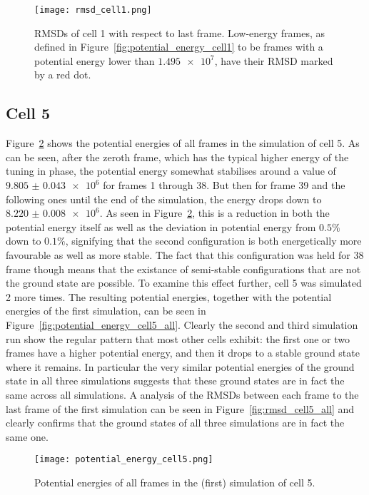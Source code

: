 \begin{figure}[ht]
\centering
  \texttt{[image: rmsd\_cell1.png]}
  \caption{RMSDs of cell 1 with respect to last frame. Low-energy frames, as defined in Figure~\ref{fig:potential_energy_cell1} to be frames with a potential energy lower than \(\num{1.495e7}\), have their RMSD marked by a red dot.}
  \label{fig:rmsd_cell1}
\end{figure}


\subsection{Cell 5} %
\label{sub:cell_5}

Figure~\ref{fig:potential_energy_cell5} shows the potential energies of all frames in the simulation of cell 5. As can be seen, after the zeroth frame, which has the typical higher energy of the tuning in phase, the potential energy somewhat stabilises around a value of \(\num{9.805(43)e6}\) for frames 1 through 38. But then for frame 39 and the following ones until the end of the simulation, the energy drops down to \(\num{8.220(8)e6}\). As seen in Figure~\ref{fig:potential_energy_cell5}, this is a reduction in both the potential energy itself as well as the deviation in potential energy from \(0.5 \%\) down to \(0.1 \%\), signifying that the second configuration is both energetically more favourable as well as more stable. The fact that this configuration was held for 38 frame though means that the existance of semi-stable configurations that are not the ground state are possible. To examine this effect further, cell 5 was simulated 2 more times. The resulting potential energies, together with the potential energies of the first simulation, can be seen in Figure~\ref{fig:potential_energy_cell5_all}. Clearly the second and third simulation run show the regular pattern that most other cells exhibit: the first one or two frames have a higher potential energy, and then it drops to a stable ground state where it remains. In particular the very similar potential energies of the ground state in all three simulations suggests that these ground states are in fact the same across all simulations. A analysis of the RMSDs between each frame to the last frame of the first simulation can be seen in Figure~\ref{fig:rmsd_cell5_all} and clearly confirms that the ground states of all three simulations are in fact the same one.

\begin{figure}[ht]
\centering
  \texttt{[image: potential\_energy\_cell5.png]}
  \caption{Potential energies of all frames in the (first) simulation of cell 5.}
  \label{fig:potential_energy_cell5}
\end{figure}

